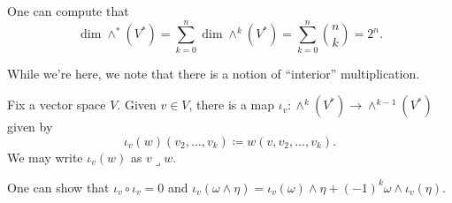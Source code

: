 \documentclass[../notes.tex]{subfiles}
\begin{document}
\begin{remark}
	One can compute that
	\[\dim\land^*(V^*)=\sum_{k=0}^n\dim\land^k(V^*)=\sum_{k=0}^n\binom nk=2^n.\]
\end{remark}
While we're here, we note that there is a notion of ``interior'' multiplication.
\begin{definition}
	Fix a vector space $V$. Given $v\in V$, there is a map $\iota_v\colon\land^k(V^*)\to\land^{k-1}(V^*)$ given by
	\[\iota_v(w)(v_2,\ldots,v_k)\coloneqq w(v,v_2,\ldots,v_k).\]
	We may write $\iota_v(w)$ as $v\lrcorner w$.
\end{definition}
\begin{remark}
	One can show that $\iota_v\circ\iota_v=0$ and $\iota_v(\omega\land\eta)=\iota_v(\omega)\land\eta+(-1)^k\omega\land\iota_v(\eta)$.
\end{remark}
\end{document}
